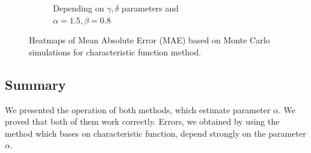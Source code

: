\documentclass{article}
\begin{document}
\begin{figure}[H]
\begin{subfigure}[r]{.5\textwidth}
				\caption{Depending on $\gamma, \delta$ parameters and \\$\alpha = 1.5, \beta = 0.8$}
			\end{subfigure}
			\caption{Heatmaps of Mean Absolute Error (MAE) based on Monte Carlo simulations for characteristic function method.}\label{heat4}
		\end{figure}
	
	\subsection{Summary}
    We presented the operation of both methods, which estimate parameter $\alpha$. We proved that both of them work correctly. Errors, we obtained by using the method which bases on characteristic function, depend strongly on the parameter $\alpha$.	 
	
\end{document}
